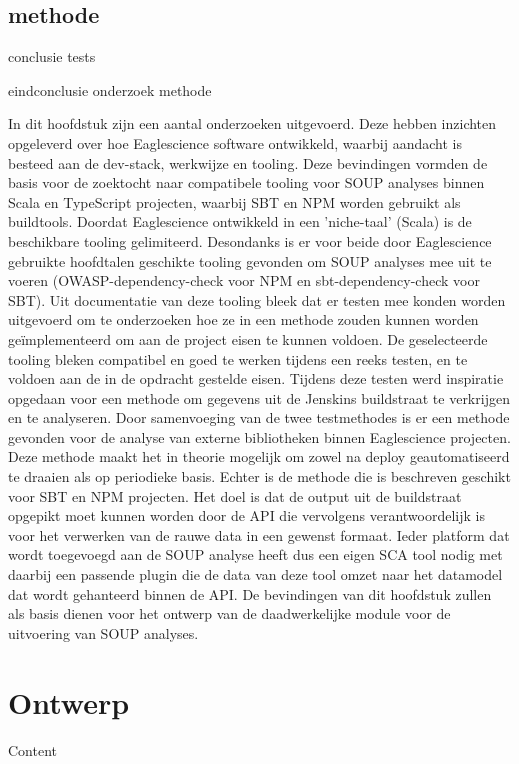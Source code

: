 \subsection{methode}\label{subsec:methode}
conclusie tests


eindconclusie onderzoek methode

In dit hoofdstuk zijn een aantal onderzoeken uitgevoerd. Deze hebben inzichten opgeleverd over hoe Eaglescience software ontwikkeld, waarbij aandacht is besteed aan de dev-stack, werkwijze en tooling. Deze bevindingen vormden de basis voor de zoektocht naar compatibele tooling voor SOUP analyses binnen Scala en TypeScript projecten, waarbij SBT en NPM worden gebruikt als buildtools. Doordat Eaglescience ontwikkeld in een 'niche-taal' (Scala) is de beschikbare tooling gelimiteerd. Desondanks is er voor beide door Eaglescience gebruikte hoofdtalen geschikte tooling gevonden om SOUP analyses mee uit te voeren (OWASP-dependency-check voor NPM en sbt-dependency-check voor SBT). Uit documentatie van deze tooling bleek dat er testen mee konden worden uitgevoerd om te onderzoeken hoe ze in een methode zouden kunnen worden geïmplementeerd om aan de project eisen te kunnen voldoen. De geselecteerde tooling bleken compatibel en goed te werken tijdens een reeks testen, en te voldoen aan de in de opdracht gestelde eisen. Tijdens deze testen werd inspiratie opgedaan voor een methode om gegevens uit de Jenskins buildstraat te verkrijgen en te analyseren. Door samenvoeging van de twee testmethodes is er een methode gevonden voor de analyse van externe bibliotheken binnen Eaglescience projecten. Deze methode maakt het in theorie mogelijk om zowel na deploy geautomatiseerd te draaien als op periodieke basis. Echter is de methode die is beschreven geschikt voor SBT en NPM projecten. Het doel is dat de output uit de buildstraat opgepikt moet kunnen worden door de API die vervolgens verantwoordelijk is voor het verwerken van de rauwe data in een gewenst formaat. Ieder platform dat wordt toegevoegd aan de SOUP analyse heeft dus een eigen SCA tool nodig met daarbij een passende plugin die de data van deze tool omzet naar het datamodel dat wordt gehanteerd binnen de API. De bevindingen van dit hoofdstuk zullen als basis dienen voor het ontwerp van de daadwerkelijke module voor de uitvoering van SOUP analyses.



\section{Ontwerp}\label{sec:implementatie}

Content

